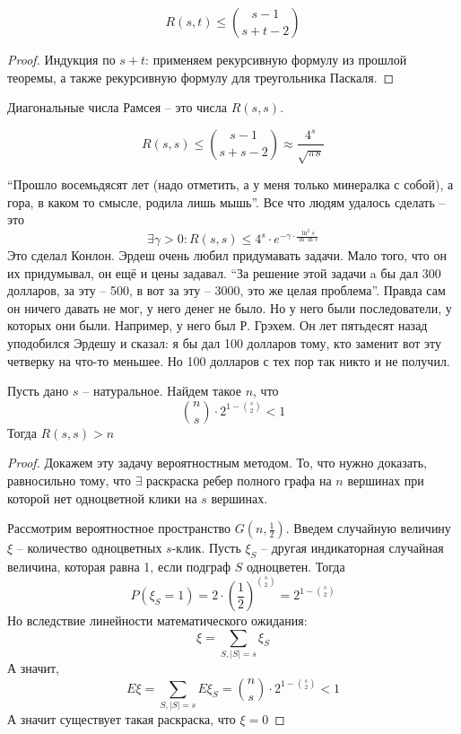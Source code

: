 \documentclass[document.tex]{subfiles}
\begin{document}
\begin{corollary}
	\[
		R(s, t) \leq \binom{s - 1}{s + t - 2}
	\]
\end{corollary}

\begin{proof}
	Индукция по $s + t$: применяем рекурсивную формулу из прошлой теоремы, а также рекурсивную формулу для треугольника Паскаля.
\end{proof}

\begin{definition}
	Диагональные числа Рамсея -- это числа $R(s, s)$.
\end{definition}

\begin{corollary}[из следствия]
	\[
		R(s, s) \leq \binom{s - 1}{s + s -2} \approx \frac{4^s}{\sqrt{\pi s}}
	\]
\end{corollary}


\begin{remark}
	``Прошло восемьдясят лет (надо отметить, а у меня только минералка с собой), а гора, в каком то смысле, родила лишь мышь''. Все что людям удалось сделать -- это $$\exists \gamma > 0 : R(s, s) \leq 4^s \cdot e^{-\gamma \cdot \frac{\ln^2 s}{\ln \ln s}}$$ Это сделал Конлон. Эрдеш очень любил придумавать задачи. Мало того, что он их придумывал, он ещё и цены задавал. ``За решение этой задачи a бы дал 300 долларов, за эту -- 500, в вот за эту -- 3000, это же целая проблема''. Правда сам он ничего давать не мог, у него денег не было. Но у него были последователи, у которых они были. Например, у него был Р. Грэхем. Он лет пятьдесят назад уподобился Эрдешу и сказал: я бы дал 100 долларов тому, кто заменит вот эту четверку на что-то меньшее. Но 100 долларов с тех пор так никто и не получил.
\end{remark}

\begin{theorem}
	Пусть дано $s$ -- натуральное. Найдем такое $n$, что
	\[
		\binom{n}{s} \cdot 2^{1-\binom{s}{2}} < 1
	\] Тогда $R(s, s) > n$
\end{theorem}

\begin{proof}
	Докажем эту задачу вероятностным методом. То, что нужно доказать, равносильно тому, что $\exists$ раскраска ребер полного графа на $n$ вершинах при которой нет одноцветной клики на $s$ вершинах.

	Рассмотрим вероятностное пространство $G(n, \frac{1}{2})$. 
	Введем случайную величину $\xi$ -- количество одноцветных $s$-клик. Пусть $\xi_S$ -- другая индикаторная случайная величина, которая равна 1, если подграф $S$ одноцветен. Тогда 
	\[
		P(\xi_S = 1) = 2 \cdot \left(\frac{1}{2}\right)^{\binom{s}{2}} = 2^{1-\binom{s}{2}}
	\]
	Но вследствие линейности математического ожидания:
	\[
		\xi = \sum_{S, |S| = s} \xi_S
	\]
	А значит, 
	\[
		E\xi = \sum_{S, |S| = s} E\xi_S = \binom{n}{s} \cdot 2^{1-\binom{s}{2}} < 1
	\]
	А значит существует такая раскраска, что $\xi = 0$
\end{proof}
\end{document}
